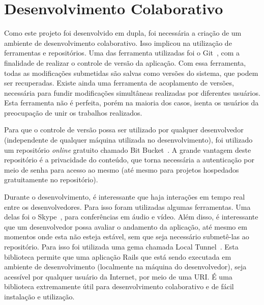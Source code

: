 \section{Desenvolvimento Colaborativo}

Como este projeto foi desenvolvido em dupla, foi necessária a criação de um ambiente de desenvolvimento colaborativo. Isso implicou na utilização de ferramentas e repositórios. Uma das ferramenta utilizadas foi o Git~\cite{git}, com a finalidade de realizar o controle de versão da aplicação. Com essa ferramenta, todas as modificações submetidas são salvas como versões do sistema, que podem ser recuperadas. Existe ainda uma ferramenta de acoplamento de versões, necessária para fundir modificações simultâneas realizadas por diferentes usuários. Esta ferramenta não é perfeita, porém na maioria dos casos, isenta os usuários da preocupação de unir os trabalhos realizados.

Para que o controle de versão possa ser utilizado por qualquer desenvolvedor (independente de qualquer máquina utilizada no desenvolvimento), foi utilizado um repositório \textit{online} gratuito chamado Bit Bucket~\cite{bitbucket}. A grande vantagem deste repositório é a privacidade do conteúdo, que torna necessária a autenticação por meio de senha para acesso ao mesmo (até mesmo para projetos hospedados gratuitamente no repositório).

Durante o desenvolvimento, é interessante que haja interações em tempo real entre os desenvolvedores. Para isso foram utilizadas algumas ferramentas. Uma delas foi o Skype~\cite{skype}, para conferências em áudio e vídeo. Além disso, é interessante que um desenvolvedor possa avaliar o andamento da aplicação, até mesmo em momentos onde esta não esteja estável, sem que seja necessário submetê-las ao repositório. Para isso foi utilizada uma gema chamada Local Tunnel~\cite{localtunnel}. Esta biblioteca permite que uma aplicação Rails que está sendo executada em ambiente de desenvolvimento (localmente na máquina do desenvolvedor), seja acessível por qualquer usuário da Internet, por meio de uma URI. É uma biblioteca extremamente útil para desenvolvimento colaborativo e de fácil instalação e utilização.
